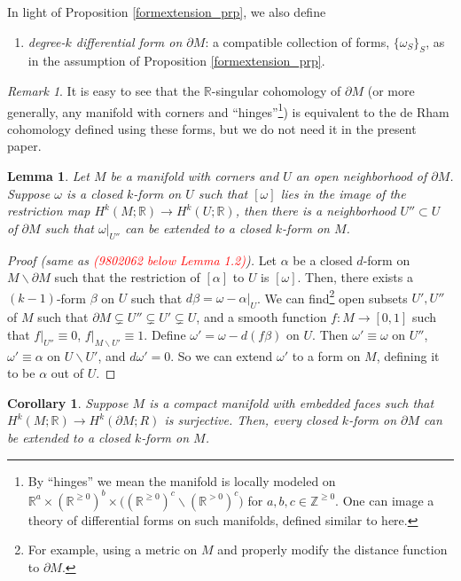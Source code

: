 \documentclass[11pt]{article}
\newtheorem{lmm}[thm]{Lemma}
\newtheorem{crl}[thm]{Corollary}
\theoremstyle{definition}
\theoremstyle{remark}
\newtheorem{rmk}[thm]{Remark}
\def\Z{\mathbb{Z}}
\def\R{\mathbb{R}}
\def\cmt#1{\textcolor{red}{(#1)}}
\begin{document}
\begin{appendices}
In light of Proposition \ref{formextension_prp}, we also define
\begin{enumerate}[label=$\cdot$, nolistsep]
\item {\it degree-$k$ differential form on $\partial M$}: a compatible collection of forms, $\{\omega_S\}_S$, as in the assumption of Proposition \ref{formextension_prp}. 
\end{enumerate}
\begin{rmk}
It is easy to see that the $\R$-singular cohomology of $\partial M$ (or more generally, any manifold with corners and ``hinges''\footnote{By ``hinges'' we mean the manifold is locally modeled on $\R^a\times(\R^{\ge0})^b\times\big((\R^{\ge0})^c\backslash(\R^{>0})^c\big)$ for $a,b,c\in\Z^{\ge0}$. One can image a theory of differential forms on such manifolds, defined similar to here.}) is equivalent to the de Rham cohomology defined using these forms, but we do not need it in the present paper.
\end{rmk}


\begin{lmm}\label{formextension_lmm}
Let $M$ be a manifold with corners and $U$ an open neighborhood of $\partial M$. 
Suppose $\omega$ is a closed $k$-form on $U$ such that $[\omega]$ lies in the image of the restriction map $H^k(M;\R)\to H^k(U;\R)$, 
then there is a neighborhood $U''\subset U$ of $\partial M$ such that $\omega|_{U''}$ can be extended to a closed $k$-form on $M$. 
\end{lmm}

\begin{proof}[Proof (same as \cmt{9802062 below Lemma 1.2})]
Let $\alpha$ be a closed $d$-form on $M\backslash{\partial M}$ such that the restriction of $[\alpha]$ to $U$ is $[\omega]$. 
Then, there exists a $(k-1)$-form $\beta$ on $U$ such that $d\beta=\omega-\alpha|_{U}$. 
We can find\footnote{For example, using a metric on $M$ and properly modify the distance function to $\partial M$.} open subsets $U',U''$ of $M$ such that $\partial M\subsetneq U''\subsetneq U'\subsetneq U$, and a smooth function $f:M\to[0,1]$ such that $f|_{U''}\equiv 0$, $f|_{M\backslash U'}\equiv1$. 
Define $\omega'=\omega-d(f\beta)$ on $U$. Then $\omega'\equiv\omega$ on $U''$, $\omega'\equiv\alpha$ on $U\backslash U'$, and $d\omega'=0$. So we can extend $\omega'$ to a form on $M$, defining it to be $\alpha$ out of $U$. 
\end{proof}

\begin{crl}\label{formextension_crl}
Suppose $M$ is a compact manifold with embedded faces such that $H^k(M;\R)\to H^k(\partial M;R)$ is surjective. Then, every closed $k$-form on $\partial M$ can be extended to a closed $k$-form on $M$. 
\end{crl}


\end{appendices}
\end{document}
